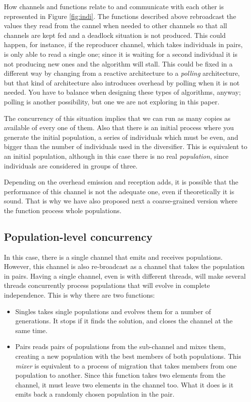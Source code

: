 \documentclass[sigconf]{acmart}
\begin{document}
How channels and functions relate to and communicate with each other is represented in Figure \ref{fig:indi}.  The functions described above rebroadcast the values they read from the cannel when needed to other channels so that all
channels are kept fed and a deadlock situation is not produced. This
could happen, for instance, if the {\sf reproducer channel}, which
takes individuals in pairs, is only able to read a single one; since it is waiting for
a second individual it is not producing new ones and the algorithm
will stall. This could be fixed in a different way by changing from a reactive architecture to a {\em polling} architecture, but that kind of architecture also introduces overhead by polling when it is not needed. You have to balance when designing these types of algorithms, anyway; polling is another possibility, but one we are not exploring in this paper. 

The concurrency of this situation implies that we can run as many
copies as available of every one of them. Also that there is an
initial process where you generate the initial population, a series of
individuals which must be even, and bigger than the number of
individuals used in the diversifier. This is equivalent to an initial
population, although in this case there is no real {\em population},
since individuals are considered in groups of three. 

Depending on the overhead emission and reception adds, it is possible
that the performance of this channel is not the adequate one, even if
theoretically it is sound. That is why we have also proposed next a
coarse-grained version where the function process whole populations.

\subsection{Population-level concurrency}

In this case, there is a single channel that emits and receives
populations. However, this channel is also re-broadcast as a channel
that takes the population in pairs. Having a single channel, even is with
different threads, will make several threads concurrently process
populations that will evolve in complete independence. This is why
there are two functions: \begin{itemize}
\item {\sf Singles} takes single populations and evolves them for a
  number of generations. It stops if it finds the solution, and closes
  the channel at the same time.
\item {\sf Pairs} reads pairs of populations from the sub-channel and
  mixes them, creating a new population with the best members of both
  populations. This {\em mixer} is equivalent to a process of
  migration that takes members from one population to another. Since
  this function takes two elements from the channel, it must leave two
  elements in the channel too. What it does is it emits back a
  randomly chosen population in the pair. 
\end{itemize}
\end{document}
